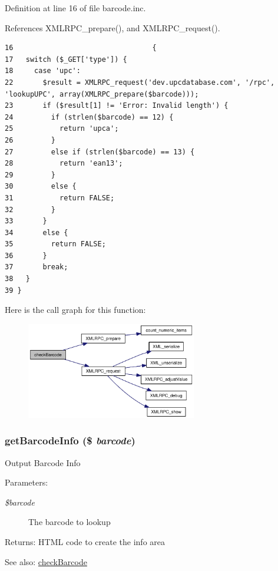 Definition at line 16 of file barcode.inc.

References XMLRPC\_\-prepare(), and XMLRPC\_\-request().

\begin{Code}\begin{verbatim}16                                 {
17   switch ($_GET['type']) {
18     case 'upc':
22       $result = XMLRPC_request('dev.upcdatabase.com', '/rpc', 'lookupUPC', array(XMLRPC_prepare($barcode)));
23       if ($result[1] != 'Error: Invalid length') {
24         if (strlen($barcode) == 12) {
25           return 'upca';
26         }
27         else if (strlen($barcode) == 13) {
28           return 'ean13';
29         }
30         else {
31           return FALSE;
32         }
33       }
34       else {
35         return FALSE;
36       }
37       break;
38   }
39 }
\end{verbatim}
\end{Code}




Here is the call graph for this function:\nopagebreak
\begin{figure}[H]
\begin{center}
\leavevmode
\includegraphics[width=211pt]{barcode_8inc_6d3645af0ef526e4f64d28dcbdceb74f_cgraph}
\end{center}
\end{figure}
\hypertarget{barcode_8inc_e10c37e4f9f9b7c6617a388351a27c99}{
\subsubsection{\setlength{\rightskip}{0pt plus 5cm}getBarcodeInfo (\$ {\em barcode})}}
\label{barcode_8inc_e10c37e4f9f9b7c6617a388351a27c99}


Output Barcode Info \begin{Desc}
\item[Parameters:]
\begin{description}
\item[{\em \$barcode}]The barcode to lookup \end{description}
\end{Desc}
\begin{Desc}
\item[Returns:]HTML code to create the info area \end{Desc}
\begin{Desc}
\item[See also:]\hyperlink{barcode_8inc_6d3645af0ef526e4f64d28dcbdceb74f}{checkBarcode} \end{Desc}


